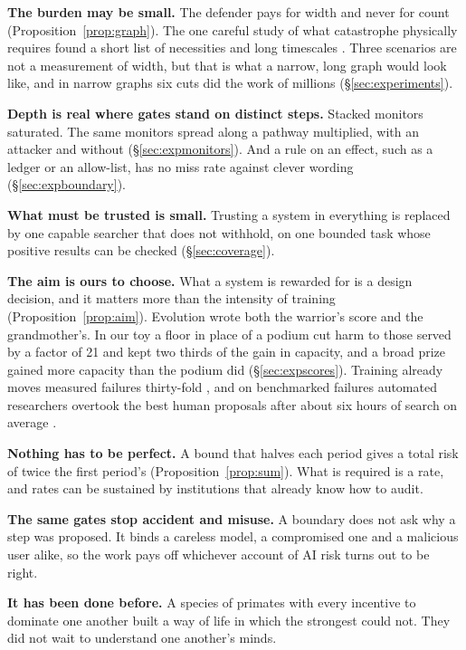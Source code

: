 \documentclass[10pt,twocolumn,letterpaper]{article}
\theoremstyle{definition}
\newcommand{\para}[1]{\smallskip\noindent\textbf{#1}\enspace}
\newcommand{\ScHarmRatio}{21}
\begin{document}
\para{The burden may be small.} The defender pays for width and never for count (Proposition~\ref{prop:graph}). The one careful study of what catastrophe physically requires found a short list of necessities and long timescales \cite{rand}. Three scenarios are not a measurement of width, but that is what a narrow, long graph would look like, and in narrow graphs six cuts did the work of millions (\S\ref{sec:experiments}).

\para{Depth is real where gates stand on distinct steps.} Stacked monitors saturated. The same monitors spread along a pathway multiplied, with an attacker and without (\S\ref{sec:expmonitors}). And a rule on an effect, such as a ledger or an allow-list, has no miss rate against clever wording (\S\ref{sec:expboundary}).

\para{What must be trusted is small.} Trusting a system in everything is replaced by one capable searcher that does not withhold, on one bounded task whose positive results can be checked (\S\ref{sec:coverage}).

\para{The aim is ours to choose.} What a system is rewarded for is a design decision, and it matters more than the intensity of training (Proposition~\ref{prop:aim}). Evolution wrote both the warrior's score and the grandmother's. In our toy a floor in place of a podium cut harm to those served by a factor of \ScHarmRatio{} and kept two thirds of the gain in capacity, and a broad prize gained more capacity than the podium did (\S\ref{sec:expscores}). Training already moves measured failures thirty-fold \cite{schoen}, and on benchmarked failures automated researchers overtook the best human proposals after about six hours of search on average \cite{chen}.

\para{Nothing has to be perfect.} A bound that halves each period gives a total risk of twice the first period's (Proposition~\ref{prop:sum}). What is required is a rate, and rates can be sustained by institutions that already know how to audit.

\para{The same gates stop accident and misuse.} A boundary does not ask why a step was proposed. It binds a careless model, a compromised one and a malicious user alike, so the work pays off whichever account of AI risk turns out to be right.

\para{It has been done before.} A species of primates with every incentive to dominate one another built a way of life in which the strongest could not. They did not wait to understand one another's minds.
\end{document}
